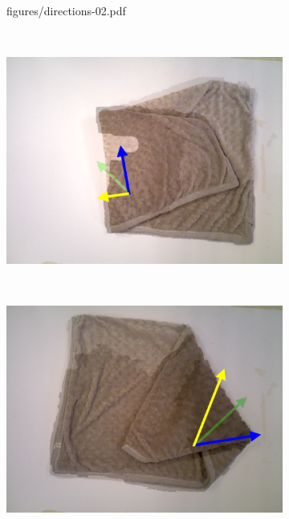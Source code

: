 \begin{figure}[htbp]
\begin{subfigure}[r]{0.49\textwidth}
    	{figures/directions-02.pdf}
    	\vspace{-10px}
	\end{subfigure} 
	~
	\begin{subfigure}[l]{0.49\textwidth}
	    \centering
    	\includegraphics[width=\textwidth]
    	{figures/directions-03.pdf}
    	\vspace{-10px}
	\end{subfigure}
	~
    \begin{subfigure}[r]{0.49\textwidth}
	    \centering
    	\includegraphics[width=\textwidth]
    	{figures/directions-04.pdf}
    	\vspace{-10px}
	\end{subfigure}
	~
	\begin{subfigure}[l]{0.49\textwidth}

\end{subfigure}
\end{figure}
